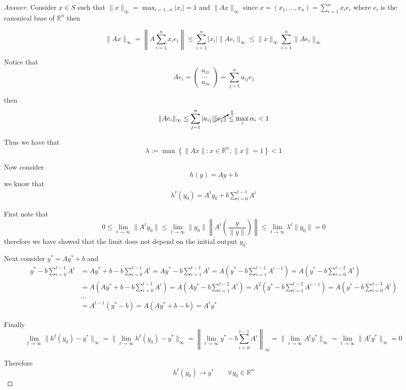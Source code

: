 \documentclass{article}
\begin{document}
\begin{proof}[Answer]
    Consider $x\in S$ such that $\|x\|_\infty = \max_{i = 1 \ldots n } |x_i| = 1$ and $\|Ax\|_\infty$ since $x = (x_1, \ldots, x_n) = \sum_{i=1}^n x_i e_i$ where $e_i$ is the canonical base of $\mathbb{R}^n$ then

    $$\|Ax\|_\infty  =  \left\|A\sum_{i=1}^n x_i e_i\right\| \leq \sum_{i=1}^n|x_i|\|Ae_i\|_\infty \leq \|x\|_\infty \sum_{i=1}^{n} \|Ae_i\|_\infty$$

    Notice that $$Ae_i = \left(\begin{array}{c} a_{i1} \\ \ldots \\ a_{in}\end{array}\right) =  \sum_{j=1}^n a_{ij}e_j $$

    then $$\|Ae_i\|_\infty \leq \sum_{j=1}^n |a_{ij}|\cancelto{1}{\|e_j\| } \leq  \max _{i} \alpha_{i} < 1 $$

    Thus we have that $$\lambda:=\max \left\{\|A x\|: x \in \mathbb{R}^{n},\|x\|=1\right\} < 1$$

    Now consider $$h(y) = Ay+ b $$ we know that 
    \begin{align*}
    h^{t}(y_0) = A^t y_0 + b\sum_{i=0}^{t-1}A^i
    \end{align*}

    First note that $$0\leq \lim_{t\to\infty} \|A^t y_0\| \leq \lim_{t\to\infty} \|y_0\| \left\|A^t\left(\frac{y}{\|y\|}\right)\right\| \leq \lim_{t\to \infty} \lambda^t\|y_0\| = 0$$
    therefore we have showed that the limit does not depend on the initial output $y_0$.

    Next consider $y^* = Ay^* + b$ and 
    \begin{align*}
    y^* -  b\sum_{i=0}^{t-1}A^i &= Ay^* + b -  b\sum_{i=0}^{t-1}A^i = Ay^* - b\sum_{i=1}^{t-1}A^i = A\left(y^* - b\sum_{i=1}^{t-1}A^{i-1}  \right) = A\left(y^* - b\sum_{i=0}^{t-2}A^{i}  \right) \\
        &=A\left(Ay^* + b -  b\sum_{i=0}^{t-1}A^i\right)=A\left(Ay^* - b\sum_{i=1}^{t-2}A^i\right) = A^2\left(y^* - b\sum_{i=1}^{t-2}A^{i-1}  \right) = A\left(y^* - b\sum_{i=0}^{t-3}A^{i}  \right) \\
        &\ldots\\
        &=A^{t-1}(y^* - b) = A(Ay^* +b - b) = A^t y^*
    \end{align*}

    Finally $$\lim_{t\to\infty}\|h^t(y_0) - y^*\|_{\infty} = \|\lim_{t\to\infty} h^t(y_0) - y^*\|_{\infty} = \left\|\lim_{t\to\infty}y^* -  b\sum_{i=0}^{t-1}A^i\right\|_{\infty} = \|\lim_{t\to\infty} A^t y^*\|_{\infty}= \lim_{t\to\infty} \|A^t y^*\|_{\infty} = 0$$

    Therefore $$h^t(y_0) \to y^* \qquad \forall y_0 \in \mathbb{R}^n $$
\end{proof}
\end{document}
